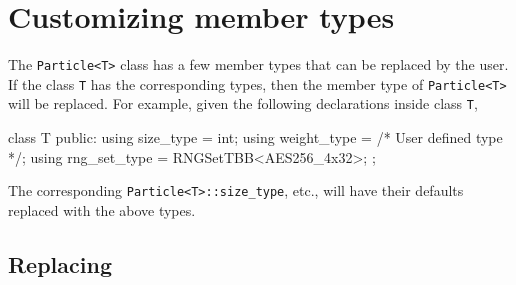 \section{Customizing member types}
\label{sec:Customizing member types}

The \verb|Particle<T>| class has a few member types that can be replaced by the
user. If the class \verb|T| has the corresponding types, then the member type
of \verb|Particle<T>| will be replaced. For example, given the following
declarations inside class \verb|T|,
\begin{cppcode}
  class T
  {
      public:
      using size_type = int;
      using weight_type = /* User defined type */;
      using rng_set_type = RNGSetTBB<AES256_4x32>;
  };
\end{cppcode}
The corresponding \verb|Particle<T>::size_type|, etc., will have their defaults
replaced with the above types.

\subsection{Replacing \protect\wtype}
\label{sub:Replacing wtype}

